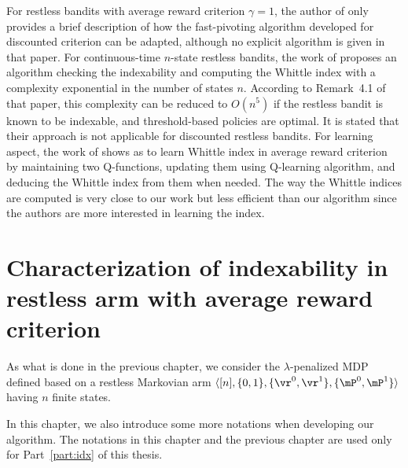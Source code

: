 For restless bandits with average reward criterion $\gamma=1$, the author of \cite{nino2020fast} only provides a brief description of how the fast-pivoting algorithm developed for discounted criterion can be adapted, although no explicit algorithm is given in that paper.
For continuous-time $n$-state restless bandits, the work of \cite{ayesta2021computation} proposes an algorithm checking the indexability and computing the Whittle index with a complexity exponential in the number of states $n$.
According to Remark~{4.1} of that paper, this complexity can be reduced to $O(n^5)$ if the restless bandit is known to be indexable, and threshold-based policies are optimal.
It is stated that their approach is not applicable for discounted restless bandits.
For learning aspect, the work of \cite{gibson2021novel} shows as to learn Whittle index in average reward criterion by maintaining two Q-functions, updating them using Q-learning algorithm, and deducing the Whittle index from them when needed.
The way the Whittle indices are computed is very close to our work but less efficient than our algorithm since the authors are more interested in learning the index. 

\section{Characterization of indexability in restless arm with average reward criterion}
\label{ch:cpt:sec:charac}

As what is done in the previous chapter, we consider the $\lambda$-penalized MDP defined based on a restless Markovian arm $\langle[n], \{0,1\}, \{\vr^0,\vr^1\}, \{\mP^0,\mP^1\}\rangle$ having $n$ finite states.

In this chapter, we also introduce some more notations when developing our algorithm. 
The notations in this chapter and the previous chapter are used only for Part~\ref{part:idx} of this thesis.

